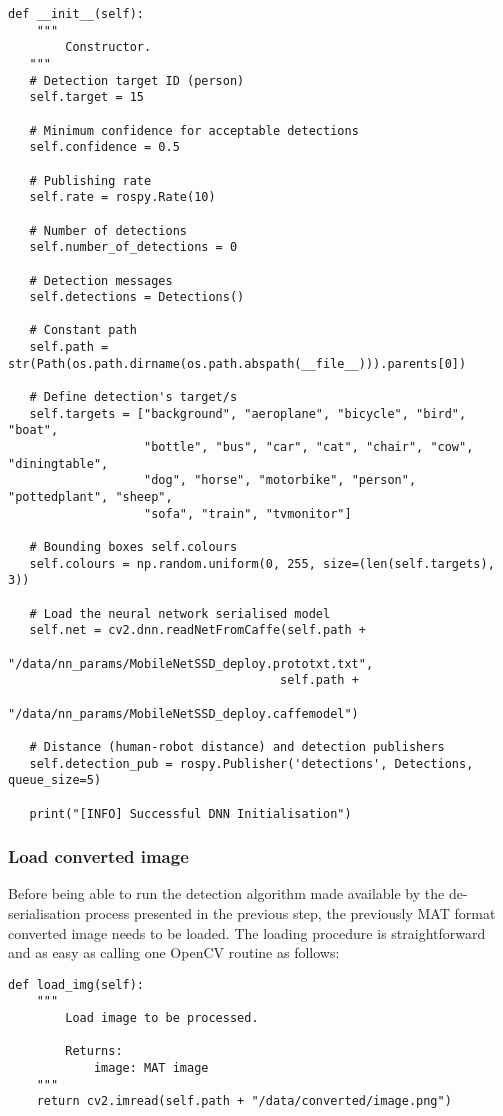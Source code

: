 \begin{lstlisting}
def __init__(self):
	"""
    	Constructor.
   """
   # Detection target ID (person)
   self.target = 15

   # Minimum confidence for acceptable detections
   self.confidence = 0.5

   # Publishing rate
   self.rate = rospy.Rate(10)

   # Number of detections
   self.number_of_detections = 0

   # Detection messages
   self.detections = Detections()

   # Constant path
   self.path = str(Path(os.path.dirname(os.path.abspath(__file__))).parents[0])

   # Define detection's target/s
   self.targets = ["background", "aeroplane", "bicycle", "bird", "boat",
                   "bottle", "bus", "car", "cat", "chair", "cow", "diningtable",
                   "dog", "horse", "motorbike", "person", "pottedplant", "sheep",
                   "sofa", "train", "tvmonitor"]

   # Bounding boxes self.colours
   self.colours = np.random.uniform(0, 255, size=(len(self.targets), 3))

   # Load the neural network serialised model
   self.net = cv2.dnn.readNetFromCaffe(self.path +
                                      "/data/nn_params/MobileNetSSD_deploy.prototxt.txt",
                                      self.path +
                                      "/data/nn_params/MobileNetSSD_deploy.caffemodel")

   # Distance (human-robot distance) and detection publishers
   self.detection_pub = rospy.Publisher('detections', Detections, queue_size=5)

   print("[INFO] Successful DNN Initialisation")
\end{lstlisting}

\subsubsection{Load converted image}

Before being able to run the detection algorithm made available by the de-serialisation process presented in the previous step, the previously MAT format converted image needs to be loaded. The loading procedure is straightforward and as easy as calling one OpenCV routine as follows:

\begin{lstlisting}
def load_img(self):
    """
    	Load image to be processed.

        Returns:
        	image: MAT image
    """
    return cv2.imread(self.path + "/data/converted/image.png")
\end{lstlisting}

